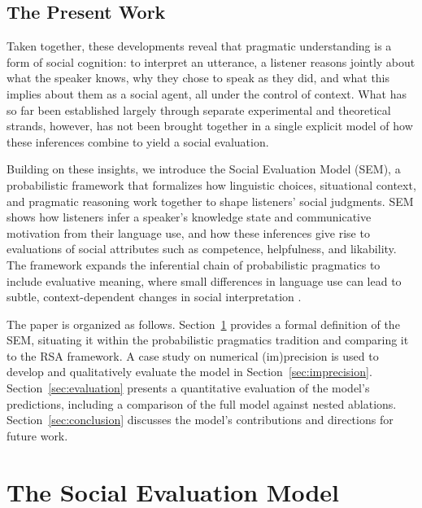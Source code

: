 \documentclass[12pt,a4paper]{article}
\begin{document}
\subsection{The Present Work}

Taken together, these developments reveal that pragmatic understanding is a form
of social cognition: to interpret an utterance, a listener reasons jointly about
what the speaker knows, why they chose to speak as they did, and what this
implies about them as a social agent, all under the control of context. What has
so far been established largely through separate experimental and theoretical
strands, however, has not been brought together in a single explicit model of how
these inferences combine to yield a social evaluation.

Building on these insights, we introduce the Social Evaluation Model (SEM), a
probabilistic framework that formalizes how linguistic choices, situational
context, and pragmatic reasoning work together to shape listeners' social
judgments. SEM shows how listeners infer a speaker's knowledge state and
communicative motivation from their language use, and how these inferences give
rise to evaluations of social attributes such as competence, helpfulness, and
likability. The framework expands the inferential chain of probabilistic
pragmatics to include evaluative meaning, where small differences in language
use can lead to subtle, context-dependent changes in social interpretation
\citep[e.g.,][]{beltramapapafragou2023}.

The paper is organized as follows. Section~\ref{sec:sem} provides a formal
definition of the SEM, situating it within the probabilistic pragmatics
tradition and comparing it to the RSA framework. A case study on numerical
(im)precision is used to develop and qualitatively evaluate the model in
Section~\ref{sec:imprecision}. Section~\ref{sec:evaluation} presents a
quantitative evaluation of the model's predictions, including a comparison of
the full model against nested ablations. Section~\ref{sec:conclusion} discusses
the model's contributions and directions for future work.


\section{The Social Evaluation Model}
\label{sec:sem}
\end{document}
